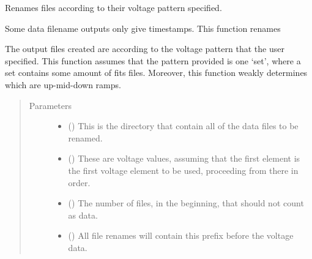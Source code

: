 \documentclass[letterpaper,10pt,english]{sphinxmanual}
\begin{document}

\begin{fulllineitems}
\label{\detokenize{python_docstrings/IfA_Smeargle.bravo.renaming:IfA_Smeargle.bravo.renaming.voltage_pattern_rename_fits}}
Renames files according to their voltage pattern specified.

Some data filename outputs only give timestamps. This function renames

The output files created are according to the voltage pattern that the
user specified. This function assumes that the pattern provided is one
‘set’, where a set contains some amount of fits files. Moreover, this
function weakly determines which are up-mid-down ramps.
\begin{quote}\begin{description}
\item[{Parameters}] \leavevmode\begin{itemize}
\item {} 
 () \textendash{} This is the directory that contain all of the data files to be
renamed.

\item {} 
 () \textendash{} These are voltage values, assuming that the first element is the
first voltage element to be used, proceeding from there in order.

\item {} 
 (\sphinxstyleliteralemphasis{\sphinxupquote{ (}}\sphinxstyleliteralemphasis{\sphinxupquote{)}}) \textendash{} The number of files, in the beginning, that should not count as data.

\item {} 
 (\sphinxstyleliteralemphasis{\sphinxupquote{ (}}\sphinxstyleliteralemphasis{\sphinxupquote{)}}) \textendash{} All file renames will contain this prefix before the voltage data.


\end{itemize}
\end{description}
\end{quote}
\end{fulllineitems}
\end{document}
